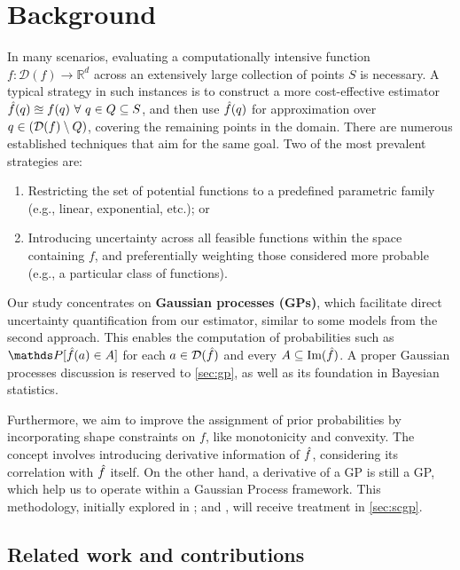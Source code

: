 \section{Background}
\label{sec:intro}

In many scenarios, evaluating a computationally intensive function  $f : \mathcal{D}(f) \to \mathbb{R}^d$ across an extensively large collection of points $S$ is necessary.
A typical strategy in such instances is to construct a more cost-effective estimator $\hat{f}(q) \approxeq f(q)\ \forall\ q\in Q \subseteq S$, and then use $\hat{f}(q)$ for approximation over  $q\in (\mathcal{D}(f) \setminus Q)$, covering the remaining points in the domain.
There are numerous established techniques that aim for the same goal. Two of the most prevalent strategies are:

\begin{enumerate}
\item Restricting the set of potential functions to a predefined parametric family (e.g., linear, exponential, etc.); or
\item Introducing uncertainty across all feasible functions within the space containing $f$, and preferentially weighting those considered more probable (e.g., a particular class of functions).
\end{enumerate}

Our study concentrates on \textbf{Gaussian processes (GPs)}, which facilitate direct uncertainty quantification from our estimator, similar to some models from the second approach.
This enables the computation of probabilities such as $\pr[\hf(a) \in A]$ for each $a \in \mathcal{D}(\hat{f})$ and every $A \subseteq \text{Im}(\hat{f})$.
A proper Gaussian processes discussion is reserved to \autoref{sec:gp}, as well as its foundation in Bayesian statistics.

Furthermore, we aim to improve the assignment of prior probabilities by incorporating shape constraints on $f$, like monotonicity and convexity. 
The concept involves introducing derivative information of $\hat{f}$, considering its correlation with $\hat{f}$ itself.
On the other hand, a derivative of a GP is still a GP, which help us to operate within a Gaussian Process framework.
This methodology, initially explored in           \citet{Rasmussen2005, Riihimaki2010}; and \cite{Berger2016}, will receive treatment in \autoref{sec:scgp}.

\subsection{Related work and contributions}


